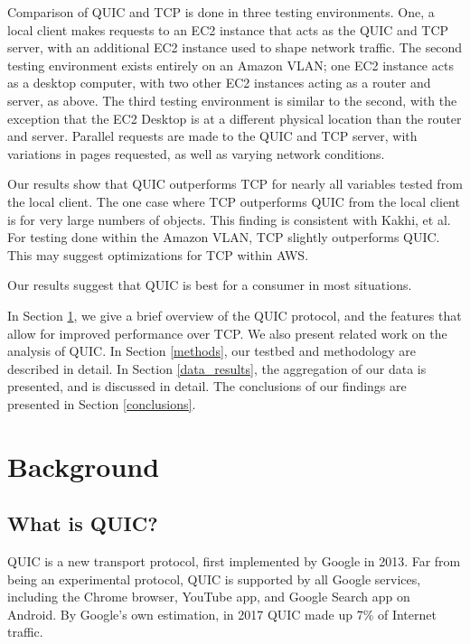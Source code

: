 \documentclass[12pt]{article}
\begin{document}
Comparison of QUIC and TCP is done in three testing environments. One, a local client makes requests to an EC2 instance that acts as the QUIC and TCP server, with an additional EC2 instance used to shape network traffic. The second testing environment exists entirely on an Amazon VLAN; one EC2 instance acts as a desktop computer, with two other EC2 instances acting as a router and server, as above. The third testing environment is similar to the second, with the exception that the EC2 Desktop is at a different physical location than the router and server. Parallel requests are made to the QUIC and TCP server, with variations in pages requested, as well as varying network conditions.

Our results show that QUIC outperforms TCP for nearly all variables tested from the local client. The one case where TCP outperforms QUIC from the local client is for very large numbers of objects. This finding is consistent with Kakhi, et al. For testing done within the Amazon VLAN, TCP slightly outperforms QUIC. This may suggest optimizations for TCP within AWS.

Our results suggest that QUIC is best for a consumer in most situations.

In Section \ref{background}, we give a brief overview of the QUIC protocol, and the features that allow for improved performance over TCP. We also present related work on the analysis of QUIC. In Section \ref{methods}, our testbed and methodology are described in detail. In Section \ref{data_results}, the aggregation of our data is presented, and is discussed in detail. The conclusions of our findings are presented in Section \ref{conclusions}.

\section{Background}
\label{background}

\subsection{What is QUIC?}
\label{background:quic}

QUIC is a new transport protocol, first implemented by Google in 2013. Far from being an experimental protocol, QUIC is supported by all Google services, including the Chrome browser, YouTube app, and Google Search app on Android\cite{Langley:2017:QTP:3098822.3098842}. By Google's own estimation, in 2017 QUIC made up 7\% of Internet traffic\cite{Langley:2017:QTP:3098822.3098842}.
\end{document}
